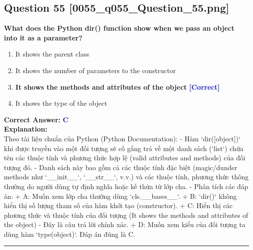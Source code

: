 \documentclass[11pt,a4paper]{article}
\begin{document}
\begin{minipage}{\textwidth}
\subsection*{Question 55 \quad \footnotesize{[0055_q055_Question_55.png]}}
\noindent \textbf{What does the Python dir() function show when we pass an object into it as a parameter?}

\begin{enumerate}[label=\Alph*.]
    \item It shows the parent class
    \item It shows the number of parameters to the constructor
    \item \textbf{It shows the methods and attributes of the object} \hfill \textcolor{blue}{\textbf{[Correct]}}
    \item It shows the type of the object
\end{enumerate}

\noindent \textbf{Correct Answer:} \textcolor{blue}{\textbf{C}} \\[4pt]
\noindent \textbf{Explanation:}\\
Theo tài liệu chuẩn của Python (Python Documentation):\newline
- Hàm `dir([object])` khi được truyền vào một đối tượng sẽ cố gắng trả về một danh sách (`list`) chứa tên các thuộc tính và phương thức hợp lệ (valid attributes and methods) của đối tượng đó.\newline
- Danh sách này bao gồm cả các thuộc tính đặc biệt (magic/dunder methods như `__init__`, `__str__`, v.v.) và các thuộc tính, phương thức thông thường do người dùng tự định nghĩa hoặc kế thừa từ lớp cha.\newline
- Phân tích các đáp án:\newline
  + A: Muốn xem lớp cha thường dùng `cls.__bases__`.\newline
  + B: `dir()` không hiển thị số lượng tham số của hàm khởi tạo (constructor).\newline
  + C: Hiển thị các phương thức và thuộc tính của đối tượng (It shows the methods and attributes of the object) - Đây là câu trả lời chính xác.\newline
  + D: Muốn xem kiểu của đối tượng ta dùng hàm `type(object)`.\newline
Đáp án đúng là C.
\end{minipage}
\vspace{0.8cm}
\hrule
\vspace{0.5cm}
\end{document}
